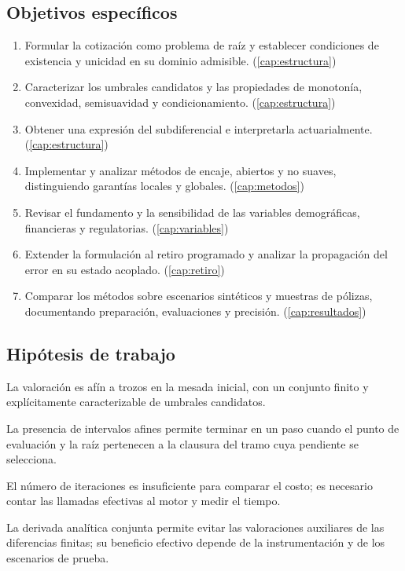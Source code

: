 \subsection*{Objetivos específicos}
\begin{enumerate}[leftmargin=*]
  \item Formular la cotización como problema de raíz y establecer condiciones de
        existencia y unicidad en su dominio admisible. (\cref{cap:estructura})
  \item Caracterizar los umbrales candidatos y las propiedades de monotonía,
        convexidad, semisuavidad y condicionamiento. (\cref{cap:estructura})
  \item Obtener una expresión del subdiferencial e interpretarla actuarialmente.
        (\cref{cap:estructura})
  \item Implementar y analizar \datoNMetodos{} métodos de encaje, abiertos y no
        suaves, distinguiendo garantías locales y globales. (\cref{cap:metodos})
  \item Revisar el fundamento y la sensibilidad de las variables demográficas,
        financieras y regulatorias. (\cref{cap:variables})
  \item Extender la formulación al retiro programado y analizar la propagación del
        error en su estado acoplado. (\cref{cap:retiro})
  \item Comparar los métodos sobre escenarios sintéticos y muestras de pólizas,
        documentando preparación, evaluaciones y precisión. (\cref{cap:resultados})
\end{enumerate}

\subsection*{Hipótesis de trabajo}
\begin{description}[leftmargin=1.2cm,style=nextline]
  \item[H1] La valoración es afín a trozos en la mesada inicial, con un conjunto
        finito y explícitamente caracterizable de umbrales candidatos.
  \item[H2] La presencia de intervalos afines permite terminar en un paso cuando
        el punto de evaluación y la raíz pertenecen a la clausura del tramo cuya
        pendiente se selecciona.
  \item[H3] El número de iteraciones es insuficiente para comparar el costo; es
        necesario contar las llamadas efectivas al motor y medir el tiempo.
  \item[H4] La derivada analítica conjunta permite evitar las valoraciones
        auxiliares de las diferencias finitas; su beneficio efectivo depende de
        la instrumentación y de los escenarios de prueba.
\end{description}

